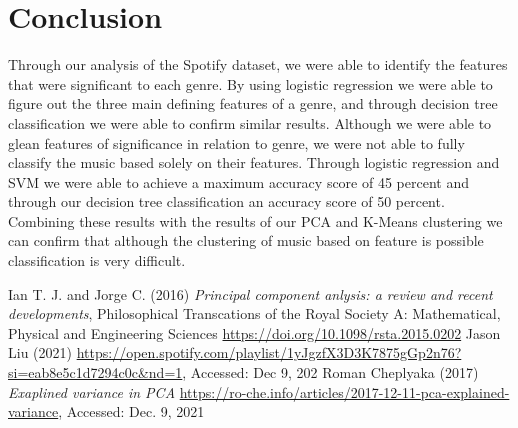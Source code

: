 \documentclass[11pt, a4paper, twocolumn]{article}
\begin{document}
\section{Conclusion}
Through our analysis of the Spotify dataset, we were able to identify the features that were significant to each genre. By using logistic regression we were able to figure out the three main defining features of a genre, and through decision tree classification we were able to confirm similar results. Although we were able to glean features of significance in relation to genre, we were not able to fully classify the music based solely on their features. Through logistic regression and SVM we were able to achieve a maximum accuracy score of 45 percent and through our decision tree classification an accuracy score of 50 percent. Combining these results with the results of our PCA and K-Means clustering we can confirm that although the clustering of music based on feature is possible classification is very difficult. 
\begin{thebibliography}{5}
Ian T. J. and Jorge C. (2016) \emph{Principal component anlysis: a review and recent developments}, Philosophical Transcations of the Royal Society A: Mathematical, Physical and Engineering Sciences \url {https://doi.org/10.1098/rsta.2015.0202}
Jason Liu (2021) \url{https://open.spotify.com/playlist/1yJgzfX3D3K7875gGp2n76?si=eab8e5c1d7294c0c&nd=1}, Accessed: Dec 9, 202
Roman Cheplyaka (2017) \emph{Exaplined variance in PCA} \url{https://ro-che.info/articles/2017-12-11-pca-explained-variance}, Accessed: Dec. 9, 2021
\end{thebibliography}
\end{document}
